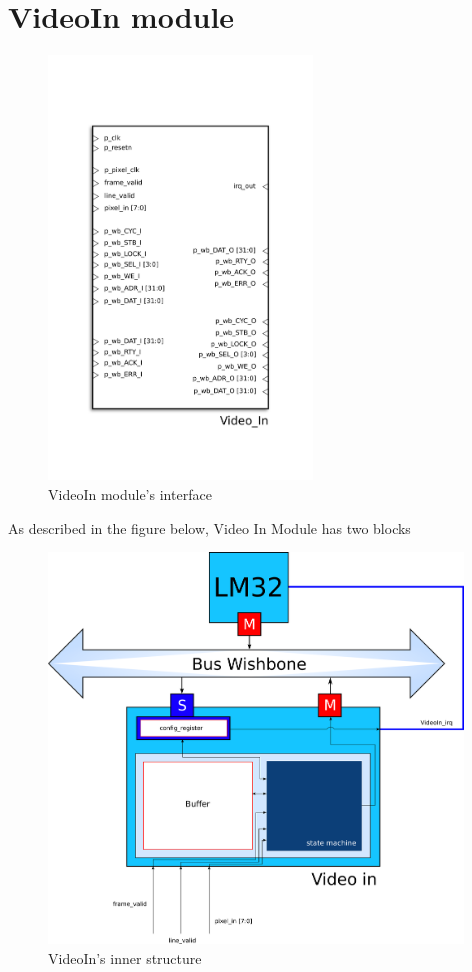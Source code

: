 
\section{VideoIn module}
\begin{figure}[H]
\center
\includegraphics[width=7cm]{figs/Video_in.pdf}
\caption{VideoIn module's interface}
\label{VideoIn_interface}
\end{figure}

As described in the figure below, Video In Module has two blocks 

\begin{figure}[h]
\center
\includegraphics[width=11cm]{figs/Video_In_blocks.pdf}
\caption{VideoIn's inner structure}
\label{VideoIn_struct}
\end{figure}

